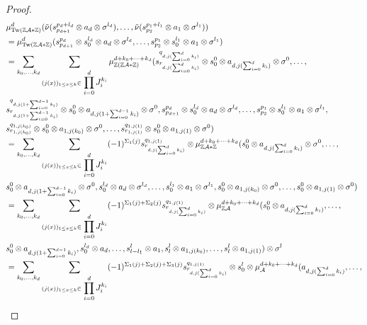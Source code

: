 \documentclass[12pt]{article}
\begin{document}
\begin{proof}
	\begin{align*}
		& \mu_{\Tw(\Z \Acat * \Z)}^d(\tilde{\nu}(s^{p_d + l_d}_{p_{d+1}} \otimes a_d \otimes \sigma^{l_d}),\dots,\tilde{\nu}(s^{p_1 + l_1}_{p_2} \otimes a_1 \otimes \sigma^{l_1})) \\
		&= \mu_{\Tw(\Z \Acat * \Z)}^d (s^{p_d}_{p_{d+1}} \otimes s^{l_d}_0 \otimes a_d \otimes \sigma^{l_d},\dots,s^{p_1}_{p_2} \otimes s^{l_1}_0 \otimes a_1 \otimes \sigma^{l_1}) \\
		&= \sum_{k_0,\dots,k_d} \sum_{(j(x))_{1 \leq x \leq k} \in \d\prod_{i=0}^d J_i^{k_i}} \mu_{\Z(\Z \Acat * \Z)}^{d+k_0+\dots+k_d}(s^{q_{d,j(\sum_{i=0}^{d} k_i)}}_{r_{d,j(\sum_{i=0}^{d} k_i)}} \otimes s^0_0 \otimes a_{d,j(\sum_{i=0}^{d}k_i)}\otimes \sigma^0,\dots, \\
		&s^{q_{d,j(1+\sum_{i=0}^{d-1} k_i)}}_{r_{d,j(1+\sum_{i=0}^{d-1} k_i)}} \otimes s^0_0 \otimes a_{d,j(1+\sum_{i=0}^{d-1}k_i)}\otimes \sigma^0,s^{p_d}_{p_{d+1}} \otimes s^{l_d}_0 \otimes a_d \otimes \sigma^{l_d},\dots,s^{p_1}_{p_2} \otimes s^{l_1}_0 \otimes a_1 \otimes \sigma^{l_1}, \\
		&s^{q_{1,j(k_0)}}_{r_{1,j(k_0)}} \otimes s^0_0 \otimes a_{1,j(k_0)} \otimes \sigma^0,\dots,s^{q_{1,j(1)}}_{r_{1,j(1)}} \otimes s^0_0 \otimes a_{1,j(1)} \otimes \sigma^0) \\
		&= \sum_{k_0,\dots,k_d} \sum_{(j(x))_{1 \leq x \leq k} \in \d\prod_{i=0}^d J_i^{k_i}} (-1)^{\Sigma_1(j)} s^{q_{1,j(1)}}_{r_{d,j(\sum_{i=0}^{d} k_i)}} \otimes \mu_{\Z \Acat * \Z}^{d+k_0+\dots+k_d}(s^0_0 \otimes a_{d,j(\sum_{i=0}^{d}k_i)}\otimes \sigma^0,\dots, \\
		&s^0_0 \otimes a_{d,j(1+\sum_{i=0}^{d-1}k_i)}\otimes \sigma^0,s^{l_d}_0 \otimes a_d \otimes \sigma^{l_d},\dots,s^{l_1}_0 \otimes a_1 \otimes \sigma^{l_1},s^0_0 \otimes a_{1,j(k_0)} \otimes \sigma^0,\dots,s^0_0 \otimes a_{1,j(1)} \otimes \sigma^0) \\
		&= \sum_{k_0,\dots,k_d} \sum_{(j(x))_{1 \leq x \leq k} \in \d\prod_{i=0}^d J_i^{k_i}} (-1)^{\Sigma_1(j) + \Sigma_2(j)} s^{q_{1,j(1)}}_{r_{d,j(\sum_{i=0}^{d} k_i)}} \otimes \mu_{\Z \Acat}^{d+k_0+\dots+k_d}(s^0_0 \otimes a_{d,j(\sum_{i=0}^{d}k_i)},\dots, \\
		&s^0_0 \otimes a_{d,j(1+\sum_{i=0}^{d-1}k_i)},s^{l_d}_0 \otimes a_d,\dots,s^{l}_{l-l_1} \otimes a_1,s^l_l \otimes a_{1,j(k_0)},\dots,s^l_l \otimes a_{1,j(1)})\otimes \sigma^l \\
		&= \sum_{k_0,\dots,k_d} \sum_{(j(x))_{1 \leq x \leq k} \in \d\prod_{i=0}^d J_i^{k_i}} (-1)^{\Sigma_1(j) + \Sigma_2(j) + \Sigma_3(j)} s^{q_{1,j(1)}}_{r_{d,j(\sum_{i=0}^{d} k_i)}} \otimes s^l_0 \otimes \mu_{\Acat}^{d+k_0+\dots+k_d}(a_{d,j(\sum_{i=0}^{d}k_i)},\dots, \\

\end{align*}
\end{proof}
\end{document}
